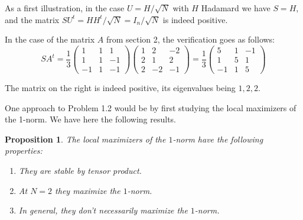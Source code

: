 \documentclass[12pt]{amsart}
\newtheorem{proposition}[theorem]{Proposition}
\begin{document}
As a first illustration, in the case $U=H/\sqrt{N}$ with $H$ Hadamard we have $S=H$, and the matrix $SU^t=HH^t/\sqrt{N}=I_n/\sqrt{N}$ is indeed positive.

In the case of the matrix $A$ from section 2, the verification goes as follows:
$$SA^t=\frac{1}{3}
\begin{pmatrix}
1&1&1\\
1&1&-1\\
-1&1&-1
\end{pmatrix}
\begin{pmatrix}
1&2&-2\\
2&1&2\\
2&-2&-1
\end{pmatrix}
=\frac{1}{3}
\begin{pmatrix}
5&1&-1\\
1&5&1\\
-1&1&5
\end{pmatrix}$$

The matrix on the right is indeed positive, its eigenvalues being $1,2,2$.

One approach to Problem 1.2 would be by first studying the local maximizers of the 1-norm. We have here the following results.

\begin{proposition}
The local maximizers of the $1$-norm have the following properties:
\begin{enumerate}
\item They are stable by tensor product.

\item At $N=2$ they maximize the $1$-norm.

\item In general, they don't necessarily maximize the $1$-norm.
\end{enumerate}
\end{proposition}
\end{document}
